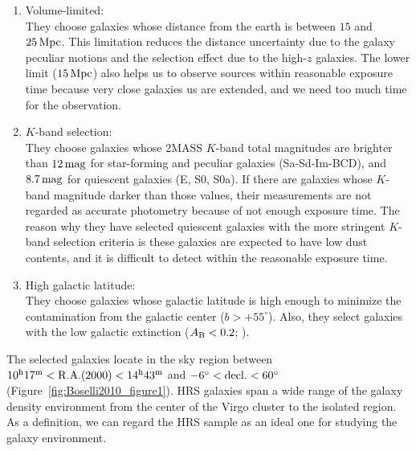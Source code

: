 \begin{enumerate}
    \item Volume-limited:\\
        They choose galaxies whose distance from the earth is between $15$ and $25\,\mathrm{Mpc}$.
        This limitation reduces the distance uncertainty due to the galaxy peculiar motions and the selection effect due to the high-$z$ galaxies.
        The lower limit ($15\,\mathrm{Mpc}$) also helps us to observe sources within reasonable exposure time because very close galaxies us are extended, and we need too much time for the observation.
    \item $K$-band selection:\\
        They choose galaxies whose 2MASS $K$-band total magnitudes are brighter than $12\,\mathrm{mag}$ for star-forming and peculiar galaxies (Sa-Sd-Im-BCD), and $8.7\,\mathrm{mag}$ for quiescent galaxies (E, S0, S0a).
        If there are galaxies whose $K$-band magnitude darker than those values, their measurements are not regarded as accurate photometry because of not enough exposure time.
        The reason why they have selected quiescent galaxies with the more stringent $K$-band selection criteria is these galaxies are expected to have low dust contents, and it is difficult to detect within the reasonable exposure time.
    \item High galactic latitude:\\
        They choose galaxies whose galactic latitude is high enough to minimize the contamination from the galactic center ($b > +55^{\circ}$).
        Also, they select galaxies with the low galactic extinction ($A_{\mathrm{B}} < 0.2$; \citealt{Schlegel1998}).
\end{enumerate}

The selected galaxies locate in the sky region between $10^{\mathrm{h}}17^{\mathrm{m}}< \mathrm{R.A.}(2000) < 14^{\mathrm{h}}43^{\mathrm{m}}$ and $-6^{\circ} < \mathrm{decl.} < 60^{\circ}$ (Figure~\ref{fig:Boselli2010_figure1}).
HRS galaxies span a wide range of the galaxy density environment from the center of the Virgo cluster to the isolated region.
As a definition, we can regard the HRS sample as an ideal one for studying the galaxy environment.

